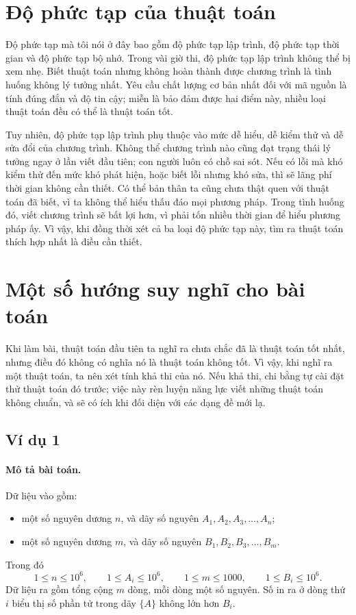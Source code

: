 \documentclass[11pt]{article}
\begin{document}
\section{Độ phức tạp của thuật toán}

Độ phức tạp mà tôi nói ở đây bao gồm độ phức tạp lập trình, độ phức tạp thời
gian và độ phức tạp bộ nhớ. Trong vài giờ thi, độ phức tạp lập trình không thể
bị xem nhẹ. Biết thuật toán nhưng không hoàn thành được chương trình là tình
huống không lý tưởng nhất. Yêu cầu chất lượng cơ bản nhất đối với mã nguồn là
tính đúng đắn và độ tin cậy; miễn là bảo đảm được hai điểm này, nhiều loại
thuật toán đều có thể là thuật toán tốt.

Tuy nhiên, độ phức tạp lập trình phụ thuộc vào mức dễ hiểu, dễ kiểm thử và dễ
sửa đổi của chương trình. Không thể chương trình nào cũng đạt trạng thái lý
tưởng ngay ở lần viết đầu tiên; con người luôn có chỗ sai sót. Nếu có lỗi mà
khó kiểm thử đến mức khó phát hiện, hoặc biết lỗi nhưng khó sửa, thì sẽ lãng
phí thời gian không cần thiết. Có thể bản thân ta cũng chưa thật quen với
thuật toán đã biết, vì ta không thể hiểu thấu đáo mọi phương pháp. Trong tình
huống đó, viết chương trình sẽ bất lợi hơn, vì phải tốn nhiều thời gian để
hiểu phương pháp ấy. Vì vậy, khi đồng thời xét cả ba loại độ phức tạp này, tìm
ra thuật toán thích hợp nhất là điều cần thiết.

\section{Một số hướng suy nghĩ cho bài toán}

Khi làm bài, thuật toán đầu tiên ta nghĩ ra chưa chắc đã là thuật toán tốt
nhất, nhưng điều đó không có nghĩa nó là thuật toán không tốt. Vì vậy, khi
nghĩ ra một thuật toán, ta nên xét tính khả thi của nó. Nếu khả thi, chi bằng
tự cài đặt thử thuật toán đó trước; việc này rèn luyện năng lực viết những
thuật toán không chuẩn, và sẽ có ích khi đối diện với các dạng đề mới lạ.

\subsection{Ví dụ 1}

\paragraph{Mô tả bài toán.}
Dữ liệu vào gồm:
\begin{itemize}
  \item một số nguyên dương \(n\), và dãy số nguyên
        \(A_1,A_2,A_3,\ldots,A_n\);
  \item một số nguyên dương \(m\), và dãy số nguyên
        \(B_1,B_2,B_3,\ldots,B_m\).
\end{itemize}
Trong đó
\[
  1\le n\le 10^6,\qquad 1\le A_i\le 10^6,\qquad
  1\le m\le 1000,\qquad 1\le B_i\le 10^6.
\]
Dữ liệu ra gồm tổng cộng \(m\) dòng, mỗi dòng một số nguyên. Số in ra ở dòng
thứ \(i\) biểu thị số phần tử trong dãy \(\{A\}\) không lớn hơn \(B_i\).
\end{document}
